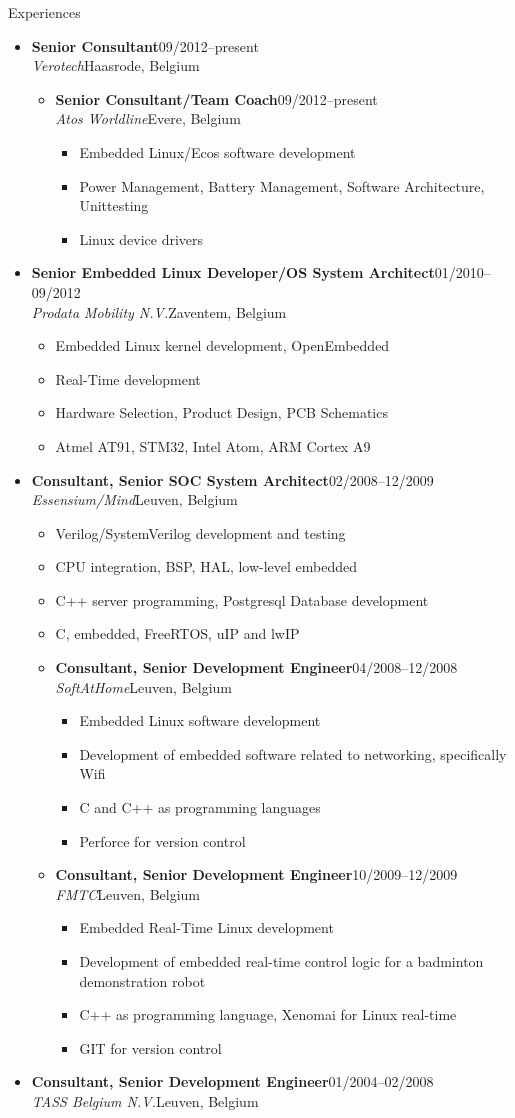 \documentclass[12pt,oneside]{article}
\newenvironment{ressection}[1]{
	\vspace{5pt}
	{\selectfont\Large#1}
	\begin{itemize}
	\vspace{5pt}
}{
	\end{itemize}
}
\newcommand{\ressubitem}[1]{
	\vspace{-4pt}
	\item \begin{flushleft} #1 \end{flushleft}
}
\newcommand{\resbigitem}[4]{
	\vspace{-5pt}
	\item
	\textbf{#1}\hfill#4 \\
	\textit{#2}\hfill#3
}
\newenvironment{ressubsec}[4]{
	\resbigitem{#1}{#2}{#3}{#4}
	\vspace{-2pt}
	\begin{itemize}
}{
	\end{itemize}
}
\newenvironment{ressubsubsec}[4]{
	\vspace{5pt}
	\resbigitem{#1}{#2}{#3}{#4}
	\begin{itemize}
}{
	\end{itemize}
}
\newcommand{\ressubsubitem}[1]{
	\vspace{-1pt}
	\item \begin{flushleft} #1 \end{flushleft}
}
\begin{document}
\begin{ressection}{Experiences}
	\begin{ressubsec}{Senior Consultant}{Verotech}{Haasrode, Belgium}{09/2012--present}
		\begin{ressubsubsec}{Senior Consultant/Team Coach}{Atos Worldline}{Evere, Belgium}{09/2012--present}
			\ressubsubitem{Embedded Linux/Ecos software development}
			\ressubsubitem{Power Management, Battery Management, Software Architecture, Unittesting}
			\ressubsubitem{Linux device drivers}
		\end{ressubsubsec}
	\end{ressubsec}
	\begin{ressubsec}{Senior Embedded Linux Developer/OS System Architect}{Prodata Mobility N.V.}{Zaventem, Belgium}{01/2010--09/2012}
		\ressubsubitem{Embedded Linux kernel development, OpenEmbedded}
		\ressubsubitem{Real-Time development}
		\ressubsubitem{Hardware Selection, Product Design, PCB Schematics}
		\ressubsubitem{Atmel AT91, STM32, Intel Atom, ARM Cortex A9}
	\end{ressubsec}
	\begin{ressubsec}{Consultant, Senior SOC System Architect}{Essensium/Mind}{Leuven, Belgium}{02/2008--12/2009}
		\ressubitem{Verilog/SystemVerilog development and testing}
		\ressubitem{CPU integration, BSP, HAL, low-level embedded}
		\ressubitem{C++ server programming, Postgresql Database development}
		\ressubitem{C, embedded, FreeRTOS, uIP and lwIP}
		\begin{ressubsubsec}{Consultant, Senior Development Engineer}{SoftAtHome}{Leuven, Belgium}{04/2008--12/2008}
			\ressubsubitem{Embedded Linux software development}
			\ressubsubitem{Development of embedded software related to networking, specifically Wifi}
			\ressubsubitem{C and C++ as programming languages}
			\ressubsubitem{Perforce for version control}
		\end{ressubsubsec}
		\begin{ressubsubsec}{Consultant, Senior Development Engineer}{FMTC}{Leuven, Belgium}{10/2009--12/2009}
			\ressubsubitem{Embedded Real-Time Linux development}
			\ressubsubitem{Development of embedded real-time control logic for a badminton demonstration robot}
			\ressubsubitem{C++ as programming language, Xenomai for Linux real-time}
			\ressubsubitem{GIT for version control}
		\end{ressubsubsec}
	\end{ressubsec}
	\begin{ressubsec}{Consultant, Senior Development Engineer}{TASS Belgium N.V.}{Leuven, Belgium}{01/2004--02/2008}

\end{ressubsec}
\end{ressection}
\end{document}
